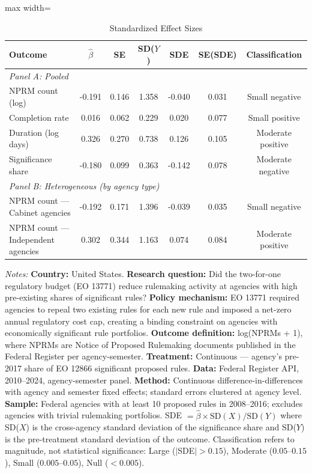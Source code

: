\begin{table}[htbp]
\centering
\caption{Standardized Effect Sizes}
\label{tab:sde}
\begin{adjustbox}{max width=\textwidth}
\begin{tabular}{lcccccc}
\toprule
Outcome & $\hat{\beta}$ & SE & SD($Y$) & SDE & SE(SDE) & Classification \\
\midrule
\multicolumn{7}{l}{\textit{Panel A: Pooled}} \\
NPRM count (log) & -0.191 & 0.146 & 1.358 & -0.040 & 0.031 & Small negative \\
Completion rate & 0.016 & 0.062 & 0.229 & 0.020 & 0.077 & Small positive \\
Duration (log days) & 0.326 & 0.270 & 0.738 & 0.126 & 0.105 & Moderate positive \\
Significance share & -0.180 & 0.099 & 0.363 & -0.142 & 0.078 & Moderate negative \\
\midrule
\multicolumn{7}{l}{\textit{Panel B: Heterogeneous (by agency type)}} \\
NPRM count --- Cabinet agencies & -0.192 & 0.171 & 1.396 & -0.039 & 0.035 & Small negative \\
NPRM count --- Independent agencies & 0.302 & 0.344 & 1.163 & 0.074 & 0.084 & Moderate positive \\
\bottomrule
\end{tabular}
\end{adjustbox}

\vspace{0.5em}
\parbox{\textwidth}{\footnotesize \textit{Notes:} \textbf{Country:} United States. \textbf{Research question:} Did the two-for-one regulatory budget (EO 13771) reduce rulemaking activity at agencies with high pre-existing shares of significant rules? \textbf{Policy mechanism:} EO 13771 required agencies to repeal two existing rules for each new rule and imposed a net-zero annual regulatory cost cap, creating a binding constraint on agencies with economically significant rule portfolios. \textbf{Outcome definition:} log(NPRMs + 1), where NPRMs are Notice of Proposed Rulemaking documents published in the Federal Register per agency-semester. \textbf{Treatment:} Continuous --- agency's pre-2017 share of EO 12866 significant proposed rules. \textbf{Data:} Federal Register API, 2010--2024, agency-semester panel. \textbf{Method:} Continuous difference-in-differences with agency and semester fixed effects; standard errors clustered at agency level. \textbf{Sample:} Federal agencies with at least 10 proposed rules in 2008--2016; excludes agencies with trivial rulemaking portfolios. SDE $= \hat{\beta} \times \text{SD}(X) / \text{SD}(Y)$ where SD($X$) is the cross-agency standard deviation of the significance share and SD($Y$) is the pre-treatment standard deviation of the outcome. Classification refers to magnitude, not statistical significance: Large ($|$SDE$| > 0.15$), Moderate ($0.05$--$0.15$), Small ($0.005$--$0.05$), Null ($< 0.005$).}
\end{table}
